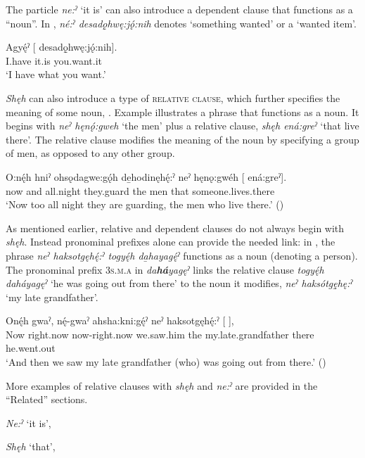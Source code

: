 The particle \textit{ne:ˀ} ‘it is’ can also introduce a dependent clause that functions as a “noun”. In , \textit{né:ˀ desadǫ̱hwę:jǫ́:nih} denotes ‘something wanted’ or a ‘wanted item’. 

\ea\label{ex:howwhatexx2}
\gll Agyę́ˀ  [  desadǫ̱hwę:jǫ́:nih]. \\
I.have it.is you.want.it\\
\glt ‘I have what you want.’
\z

\textit{Shęh} can also introduce a type of \textsc{relative clause}, which further specifies the meaning of some noun, . Example  illustrates a phrase that functions as a noun. It begins with \textit{neˀ hęnǫ́:gweh} ‘the men’ plus a relative clause, \textit{shęh ená:greˀ} ‘that live there’. The relative clause modifies the meaning of the noun by specifying a group of men, as opposed to any other group. 
 
\ea\label{ex:whoexsen4}
\gll O:nę́h hniˀ ohsǫdagwe:gǫ́h de̱hodinęhę́:ˀ neˀ hęnǫ:gwéh  [  ená:greˀ]. \\
now and all.night they.guard the men that someone.lives.there\\
\glt ‘Now too all night they are guarding, the men who live there.’ (\cite{keye_hnyagwaidatgigowah_2012})
\z

 As mentioned earlier, relative and dependent clauses do not always begin with \textit{shęh}. Instead pronominal prefixes alone can provide the needed link: in , the phrase \textit{neˀ haksotgęhę́:ˀ togyę́h da̱hayagę́ˀ} functions as a noun (denoting a person). The pronominal prefix  \textsc{3s.m.a} in \textit{da\textbf{há}yagęˀ} links the relative clause \textit{togyę́h daháyagęˀ} ‘he was going out from there’ to the noun it modifies, \textit{neˀ haksótgę̱hę:ˀ} ‘my late grandfather’.

\ea\label{ex:whoexsen5} 
\gll Onę́h gwaˀ, nę́-gwaˀ ahsha:kni:gę́ˀ neˀ haksotgęhę́:ˀ  [  ],\\
Now right.now now-right.now we.saw.him the my.late.grandfather there he.went.out\\
\glt ‘And then we saw my late grandfather (who) was going out from there.’ (\cite{henry_de_2005})
\z

More examples of relative clauses with \textit{shęh} and \textit{ne:ˀ} are provided in the “Related” sections.

\begin{CayugaRelated}
\item{}\textit{Ne:ˀ} ‘it is’, 

\item{}\textit{Shęh} ‘that’, 

\end{CayugaRelated}




